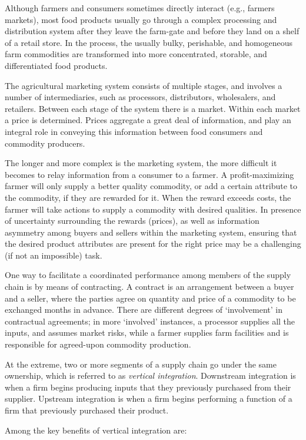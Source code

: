 \documentclass[
  oneside]{book}
\begin{document}
Although farmers and consumers sometimes directly interact (e.g., farmers markets), most food products usually go through a complex processing and distribution system after they leave the farm-gate and before they land on a shelf of a retail store. In the process, the usually bulky, perishable, and homogeneous farm commodities are transformed into more concentrated, storable, and differentiated food products.

The agricultural marketing system consists of multiple stages, and involves a number of intermediaries, such as processors, distributors, wholesalers, and retailers. Between each stage of the system there is a market. Within each market a price is determined. Prices aggregate a great deal of information, and play an integral role in conveying this information between food consumers and commodity producers.

The longer and more complex is the marketing system, the more difficult it becomes to relay information from a consumer to a farmer. A profit-maximizing farmer will only supply a better quality commodity, or add a certain attribute to the commodity, if they are rewarded for it. When the reward exceeds costs, the farmer will take actions to supply a commodity with desired qualities. In presence of uncertainty surrounding the rewards (prices), as well as information asymmetry among buyers and sellers within the marketing system, ensuring that the desired product attributes are present for the right price may be a challenging (if not an impossible) task.

One way to facilitate a coordinated performance among members of the supply chain is by means of contracting. A contract is an arrangement between a buyer and a seller, where the parties agree on quantity and price of a commodity to be exchanged months in advance. There are different degrees of `involvement' in contractual agreements; in more `involved' instances, a processor supplies all the inputs, and assumes market risks, while a farmer supplies farm facilities and is responsible for agreed-upon commodity production.

At the extreme, two or more segments of a supply chain go under the same ownership, which is referred to as \emph{vertical integration}. Downstream integration is when a firm begins producing inputs that they previously purchased from their supplier. Upstream integration is when a firm begins performing a function of a firm that previously purchased their product.

Among the key benefits of vertical integration are:
\end{document}
